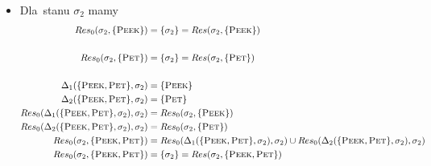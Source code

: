 \documentclass[11pt,a4paper]{article}
\begin{document}
\begin{itemize}
    \item Dla~stanu $\sigma_2$ mamy
    \begin{align*}
        Res_0(\sigma_2, \{ \textsc{Peek} \}) &= \{ \sigma_2 \} = Res(\sigma_2, \{ \textsc{Peek} \}) \\
        \\
        Res_0(\sigma_2, \{ \textsc{Pet} \}) &= \{ \sigma_2 \} = Res(\sigma_2, \{ \textsc{Pet} \}) \\
        \\
        \Delta_1(\{\textsc{Peek},\textsc{Pet}\}, \sigma_2) &= \{\textsc{Peek}\} \\
        \Delta_2(\{\textsc{Peek},\textsc{Pet}\}, \sigma_2) &= \{\textsc{Pet}\} \\
        Res_0(\Delta_1(\{\textsc{Peek},\textsc{Pet}\}, \sigma_2), \sigma_2) &= Res_0(\sigma_2, \{ \textsc{Peek} \}) \\
        Res_0(\Delta_2(\{\textsc{Peek},\textsc{Pet}\}, \sigma_2), \sigma_2) &= Res_0(\sigma_2, \{ \textsc{Pet} \}) \\
        Res_0(\sigma_2, \{\textsc{Peek},\textsc{Pet}\}) &= Res_0(\Delta_1(\{\textsc{Peek},\textsc{Pet}\}, \sigma_2), \sigma_2) \cup Res_0(\Delta_2(\{\textsc{Peek},\textsc{Pet}\}, \sigma_2), \sigma_2) \\
        Res_0(\sigma_2, \{\textsc{Peek},\textsc{Pet}\}) &= \{ \sigma_2 \} = Res(\sigma_2, \{\textsc{Peek},\textsc{Pet}\})
    \end{align*}
\end{itemize}
\end{document}

